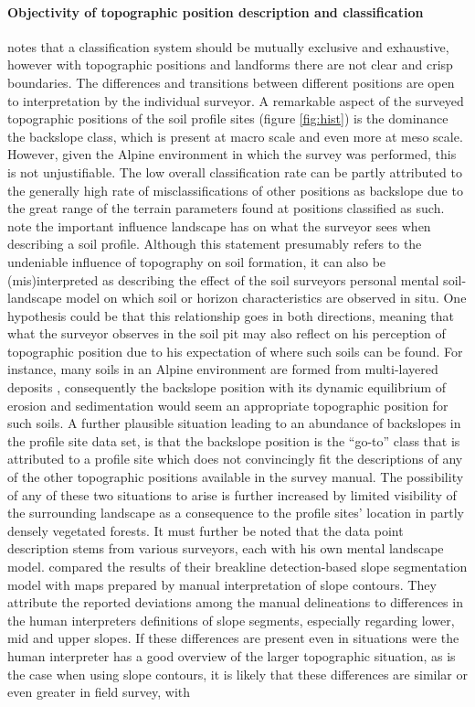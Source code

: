 \documentclass[preprint,12pt,authoryear]{elsarticle}
\begin{document}
\paragraph{Objectivity of topographic position description and classification}
\cite{Congalton1991} notes that a classification system should be mutually exclusive and exhaustive, however with topographic positions and landforms there are not clear and crisp boundaries. The differences and transitions between different positions are open to interpretation by the individual surveyor. A remarkable aspect of the surveyed topographic positions of the soil profile sites (figure \ref{fig:hist}) is the dominance the backslope class, which is present at macro scale and even more at meso scale. However, given the Alpine environment in which the survey was performed, this is not unjustifiable. The low overall classification rate can be partly attributed to the generally high rate of misclassifications of other positions as backslope due to the great range of the terrain parameters found at positions classified as such. \cite{Brevik2015} note the important influence landscape has on what the surveyor sees when describing a soil profile. Although this statement presumably refers to the undeniable influence of topography on soil formation, it can also be (mis)interpreted as describing the effect of the soil surveyors personal mental soil-landscape model on which soil or horizon characteristics are observed in situ. One hypothesis could be that this relationship goes in both directions, meaning that what the surveyor observes in the soil pit may also reflect on his perception of topographic position due to his expectation of where such soils can be found. For instance, many soils in an Alpine environment are formed from multi-layered deposits \citep{Baruck2015,Geitner2011a}, consequently the backslope position with its dynamic equilibrium of erosion and sedimentation would seem an appropriate topographic position for such soils. A further plausible situation leading to an abundance of backslopes in the profile site data set, is that the backslope position is the ``go-to'' class that is attributed to a profile site which does not convincingly fit the descriptions of any of the other topographic positions available in the survey manual. The possibility of any of these two situations to arise is further increased by limited visibility of the surrounding landscape as a consequence to the profile sites' location in partly densely vegetated forests. It must further be noted that the data point description stems from various surveyors, each with his own mental landscape model. \cite{Matsuura2012} compared the results of their breakline detection-based slope segmentation model with maps prepared by manual interpretation of slope contours. They attribute the reported deviations among the manual delineations to differences in the human interpreters definitions of slope segments, especially regarding lower, mid and upper slopes. If these differences are present even in situations were the human interpreter has a good overview of the larger topographic situation, as is the case when using slope contours, it is likely that these differences are similar or even greater in field survey, with 
\end{document}
